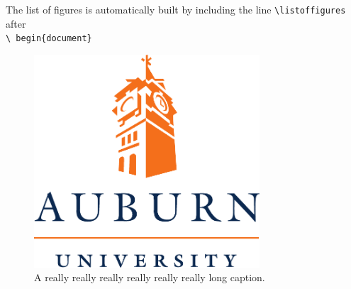\documentclass[12pt]{article}
\begin{document}
\LARGE
\listoffigures
\vspace{36pt}
The list of figures is automatically built by including the line
\texttt{\textbackslash listoffigures} after\\ \texttt{\textbackslash
begin\{document\}}
\begin{figure}[htbp]
  \centering
  \includegraphics[width=0.75\textwidth]{aulogo.pdf}
  \caption[Short Description]{\large A really really really really really really long caption.}
  \label{fig:aulogo}
\end{figure}
\end{document}
